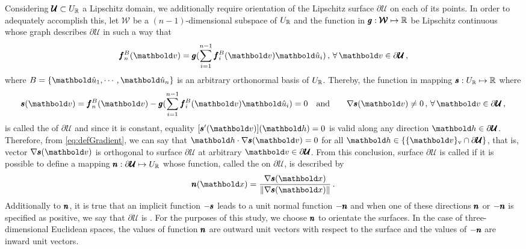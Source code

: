 Considering $\pmb{\mathcal{U}}\subset U_{\mathbb{R}}$ a Lipschitz domain, we additionally require orientation of the Lipschitz surface $\partial\pmb{\mathcal{U}}$ on each of its points. In order to adequately accomplish this, let $\pmb{\mathcal{W}}$ be a $(n-1)$-dimensional subspace of $U_{\mathbb{R}}$ and the function in $\pmb{g} : \pmb{\mathcal{W}} \mapsto \mathbb{R}$ be Lipschitz continuous whose graph describes $\partial\pmb{\mathcal{U}}$ in such a way that
\begin{equation*}
\fua{\vtf{f}_n^B}{\vto{v}} = \fua{\vtf{g}}{\sum_{i=1}^{n-1}\fua{\vtf{f}_i^B}{\vto{v}}\vun{u}_i}\,,\,\forall\,\vto{v}\in\partial\pmb{\mathcal{U}}\,,
\end{equation*}
where $B=\{\vun{u}_1,\cdots,\vun{u}_n\}$ is an arbitrary orthonormal basis of $U_{\mathbb{R}}$. Thereby, the function in mapping $\pmb{s} : U_{\mathbb{R}} \mapsto \mathbb{R}$ where
\begin{alignat}{3}\label{eq:impliSurf}
\fua{\vtf{s}}{\vto{v}} = \fua{\vtf{f}_n^B}{\vto{v}} - \fua{\vtf{g}}{\sum_{i=1}^{n-1}\fua{\vtf{f}_i^B}{\vto{v}}\vun{u}_i}=0& \quad\text{and} \quad &\fua{\nabla\vtf{s}}{\vto{v}}\neq 0\,,\,\forall\,\vto{v}\in\partial\pmb{\mathcal{U}}\,,
\end{alignat}
is called the  of $\partial\pmb{\mathcal{U}}$ and since it is constant, equality $[\fua{\vtf{s}'}{\vto{v}}](\vto{h})=0$ is valid along any direction $\vto{h}\in\partial\pmb{\mathcal{U}}$. Therefore,  from \eqref{eq:defGradient}, we can say that $\vto{h}\cdot\fua{\nabla\vtf{s}}{\vto{v}}=0$ for all $\vto{h}\in\{\viz{\vto{v}}\cap\partial\pmb{\mathcal{U}}\}$, that is, vector $\fua{\nabla\vtf{s}}{\vto{v}}$ is orthogonal to surface $\partial\pmb{\mathcal{U}}$ at arbitrary $\vto{v}\in\partial\pmb{\mathcal{U}}$. From this conclusion, surface $\partial\pmb{\mathcal{U}}$ is called  if it is possible to define a mapping $\pmb{n} : \partial\pmb{\mathcal{U}} \mapsto U_{\mathbb{R}}$ whose function, called the  on $\partial\pmb{\mathcal{U}}$, is described by
\begin{equation}
\fua{\vtf{n}}{\vto{x}}=\dfrac{\fua{\nabla\vtf{s}}{\vto{x}}}{\|\fua{\nabla\vtf{s}}{\vto{x}}\|}\,.
\end{equation}
Additionally to $\pmb{n}$, it is true that an implicit function $-\pmb{s}$ leads to a unit normal function $-\pmb{n}$ and when one of these directions $\pmb{n}$ or $-\pmb{n}$ is specified as positive, we say that $\partial\pmb{\mathcal{U}}$ is . For the purposes of this study, we choose $\pmb{n}$ to orientate the surfaces. In the case of three-dimensional Euclidean spaces, the values of function $\pmb{n}$ are outward unit vectors with respect to the surface and the values of $-\pmb{n}$ are inward unit vectors.

